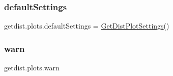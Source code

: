 \subsubsection{\texorpdfstring{default\+Settings}{defaultSettings}}
{\footnotesize\ttfamily getdist.\+plots.\+default\+Settings = \mbox{\hyperlink{classgetdist_1_1plots_1_1GetDistPlotSettings}{Get\+Dist\+Plot\+Settings}}()}

\mbox{\label{namespacegetdist_1_1plots_a4806396b6b1ef165505f39ea2a8846b0}} 
\subsubsection{\texorpdfstring{warn}{warn}}
{\footnotesize\ttfamily getdist.\+plots.\+warn}

